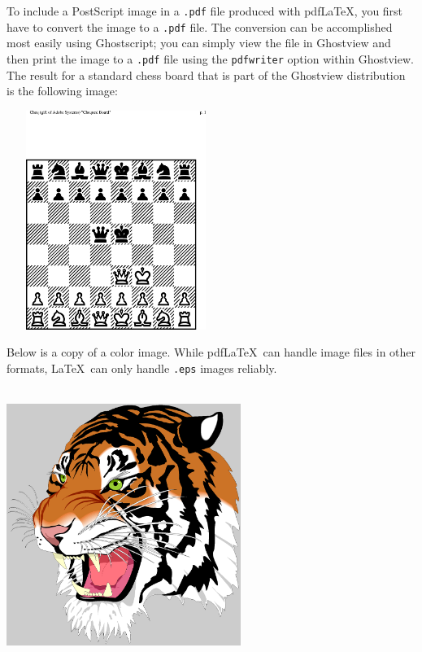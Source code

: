 \documentclass{endm}
\begin{document}
To include a PostScript image in a \texttt{.pdf} file produced with
pdf\LaTeX, you first have to convert the image to a \texttt{.pdf} file.
The conversion can be accomplished most easily using Ghostscript; you
can simply view the file in Ghostview and then print the image to a
\texttt{.pdf} file using the \verb+pdfwriter+ option within Ghostview.
The result for a standard chess board that is part of the Ghostview
distribution is the following image:\\

\begin{center}
\includegraphics[height=2.8in,width=2.8in]{chess.eps}
\end{center}

Below is a copy of a color image. While pdf\LaTeX\ can handle image
files in other formats, \LaTeX\ can only handle \texttt{.eps} images
reliably.\\

\begin{center}
\includegraphics[height=3.5in,width=3in]{tigre.eps}
\end{center}
\end{document}
